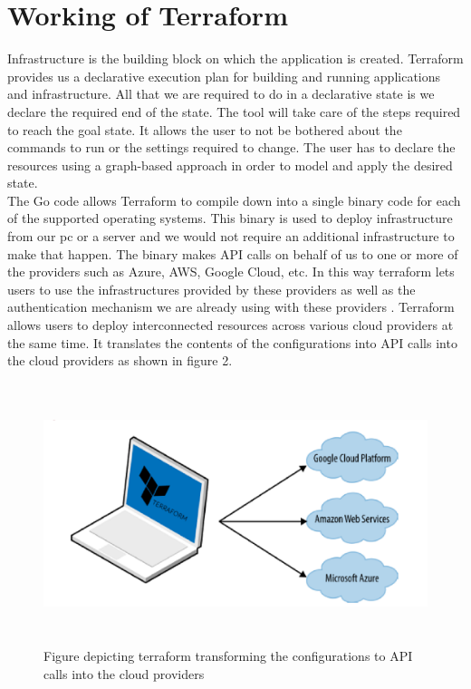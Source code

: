 \documentclass[9pt,twocolumn,twoside]{../../styles/osajnl}
\begin{document}
\section{Working of Terraform}
Infrastructure is the building block on which the application is
created. Terraform provides us a declarative execution plan for
building and running applications and infrastructure. All that we are
required to do in a declarative state is we declare the required end of the
state. The tool will take care of the steps required to reach the goal
state. It allows the user to not be bothered about the commands to run
or the settings required to change.  The user has to declare the
resources using a graph-based approach in order to model and apply the
desired state\cite{www-terraform-book}.\\ The Go code allows Terraform
to compile down into a single binary code for each of the supported
operating systems. This binary is used to deploy infrastructure from
our pc or a server and we would not require an additional
infrastructure to make that happen. The binary makes API calls on
behalf of us to one or more of the providers such as Azure, AWS,
Google Cloud, etc. In this way terraform lets users to use the
infrastructures provided by these providers as well as the
authentication mechanism we are already using with these providers
\cite{www-terraform-upandrunning}. Terraform allows users to deploy
interconnected resources across various cloud providers at the same
time. It translates the contents of the configurations into API calls
into the cloud providers as shown in figure 2.


\begin{figure}[h]
  \begin{center}
\includegraphics[width=\linewidth,height=3in]{images/terraform_1}
\caption{Figure depicting terraform transforming the configurations to
  API calls into the cloud providers \cite{www-terraform-book}}
\label{fig:work}
\end{center}
\end{figure}
\end{document}
